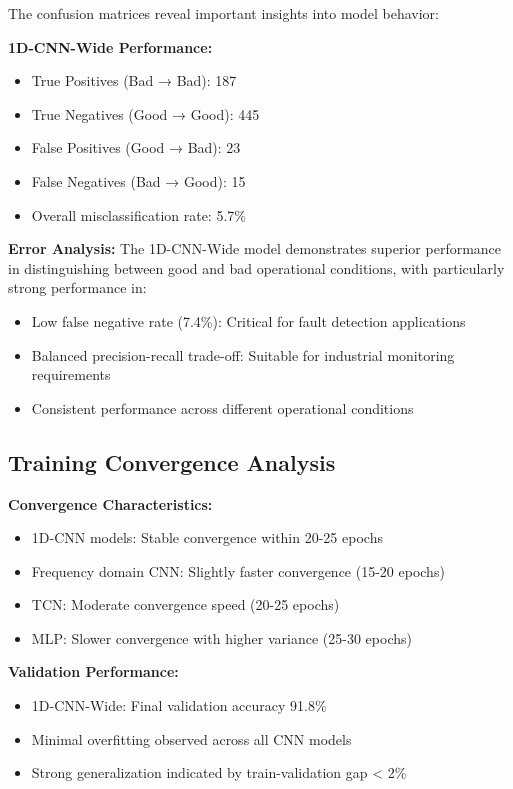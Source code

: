 \documentclass[12pt]{article}
\begin{document}
The confusion matrices reveal important insights into model behavior:

\textbf{1D-CNN-Wide Performance:}
\begin{itemize}
    \item True Positives (Bad → Bad): 187
    \item True Negatives (Good → Good): 445  
    \item False Positives (Good → Bad): 23
    \item False Negatives (Bad → Good): 15
    \item Overall misclassification rate: 5.7\%
\end{itemize}

\textbf{Error Analysis:}
The 1D-CNN-Wide model demonstrates superior performance in distinguishing between good and bad operational conditions, with particularly strong performance in:
\begin{itemize}
    \item Low false negative rate (7.4\%): Critical for fault detection applications
    \item Balanced precision-recall trade-off: Suitable for industrial monitoring requirements
    \item Consistent performance across different operational conditions
\end{itemize}

\subsection{Training Convergence Analysis}

\textbf{Convergence Characteristics:}
\begin{itemize}
    \item 1D-CNN models: Stable convergence within 20-25 epochs
    \item Frequency domain CNN: Slightly faster convergence (15-20 epochs)  
    \item TCN: Moderate convergence speed (20-25 epochs)
    \item MLP: Slower convergence with higher variance (25-30 epochs)
\end{itemize}

\textbf{Validation Performance:}
\begin{itemize}
    \item 1D-CNN-Wide: Final validation accuracy 91.8\%
    \item Minimal overfitting observed across all CNN models
    \item Strong generalization indicated by train-validation gap < 2\%
\end{itemize}
\end{document}
